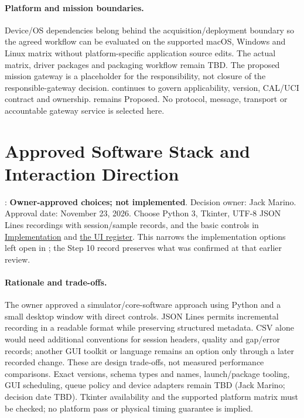 \paragraph{Platform and mission boundaries.}
Device/OS dependencies belong behind the acquisition/deployment boundary so
the agreed workflow can be evaluated on the supported macOS, Windows and Linux
matrix without platform-specific application source edits. The actual matrix,
driver packages and packaging workflow remain TBD. The proposed mission gateway
is a placeholder for the responsibility, not closure of the responsible-gateway
decision.  continues to govern applicability, version,
CAL/UCI contract and ownership.  remains Proposed.
No protocol, message, transport or accountable gateway service is selected here.

\section{Approved Software Stack and Interaction Direction}
\label{Section:SoftwareStackDecision}
: \textbf{Owner-approved choices; not implemented}.
Decision owner: Jack Marino. Approval date: November 23, 2026.
Choose Python 3, Tkinter, UTF-8 JSON Lines recordings with session/sample
records, and the basic controls in
\hyperref[Section:ApprovedSoftwareChoices]{Implementation} and
\hyperref[Table:ApprovedControls]{the UI register}. This narrows the
implementation options left open in ; the Step 10
record preserves what was confirmed at that earlier review.

\paragraph{Rationale and trade-offs.}
The owner approved a simulator/core-software approach using Python and a small
desktop window with direct controls. JSON Lines permits incremental recording
in a readable format while preserving structured metadata. CSV alone would
need additional conventions for session headers, quality and gap/error
records; another GUI toolkit or language remains an option only through a
later recorded change. These are design trade-offs, not measured performance
comparisons. Exact versions, schema types and names, launch/package tooling,
GUI scheduling, queue policy and device adapters remain TBD (Jack Marino;
decision date TBD). Tkinter availability and the supported platform matrix
must be checked; no platform pass or physical timing guarantee is implied.

